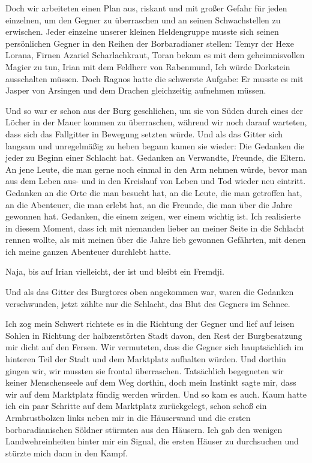 Doch wir arbeiteten einen Plan aus, riskant und mit großer Gefahr für jeden einzelnen, um den Gegner zu überraschen und an seinen Schwachstellen zu erwischen. Jeder einzelne unserer kleinen Heldengruppe musste sich seinen persönlichen Gegner in den Reihen der Borbaradianer stellen: Temyr der Hexe Lorana, Firnen Azariel Scharlachkraut, Toran bekam es mit dem geheimnisvollen Magier zu tun, Irian mit dem Feldherr von Rabenmund, Ich würde Dorkstein ausschalten müssen. Doch Ragnos hatte die schwerste Aufgabe: Er musste es mit Jasper von Arsingen und dem Drachen gleichzeitig aufnehmen müssen. 

Und so war er schon aus der Burg geschlichen, um sie von Süden durch eines der Löcher in der Mauer kommen zu überraschen, während wir noch darauf warteten, dass sich das Fallgitter in Bewegung setzten würde. Und als das Gitter sich langsam und unregelmäßig zu heben begann kamen sie wieder: Die Gedanken die jeder zu Beginn einer Schlacht hat. Gedanken an Verwandte, Freunde, die Eltern. An jene Leute, die man gerne noch einmal in den Arm nehmen würde, bevor man aus dem Leben aus- und in den Kreislauf von Leben und Tod wieder neu eintritt. Gedanken an die Orte die man besucht hat, an die Leute, die man getroffen hat, an die Abenteuer, die man erlebt hat, an die Freunde, die man über die Jahre gewonnen hat. Gedanken, die einem zeigen, wer einem wichtig ist. Ich realisierte in diesem Moment, dass ich mit niemanden lieber an meiner Seite in die Schlacht rennen wollte, als mit meinen über die Jahre lieb gewonnen Gefährten, mit denen ich meine ganzen Abenteuer durchlebt hatte.

Naja, bis auf Irian vielleicht, der ist und bleibt ein Fremdji.

Und als das Gitter des Burgtores oben angekommen war, waren die Gedanken verschwunden, jetzt zählte nur die Schlacht, das Blut des Gegners im Schnee.

Ich zog mein Schwert richtete es in die Richtung der Gegner und lief auf leisen Sohlen in Richtung der halbzerstörten Stadt davon, den Rest der Burgbesatzung mir dicht auf den Fersen. Wir vermuteten, dass die Gegner sich hauptsächlich im hinteren Teil der Stadt und dem Marktplatz aufhalten würden. Und dorthin gingen wir, wir mussten sie frontal überraschen. Tatsächlich begegneten wir keiner Menschenseele auf dem Weg dorthin, doch mein Instinkt sagte mir, dass wir auf dem Marktplatz fündig werden würden. Und so kam es auch. Kaum hatte ich ein paar Schritte auf dem Marktplatz zurückgelegt, schon schoß ein Armbrustbolzen links neben mir in die Häuserwand und die ersten borbaradianischen Söldner stürmten aus den Häusern. Ich gab den wenigen Landwehreinheiten hinter mir ein Signal, die ersten Häuser zu durchsuchen und stürzte mich dann in den Kampf. 

